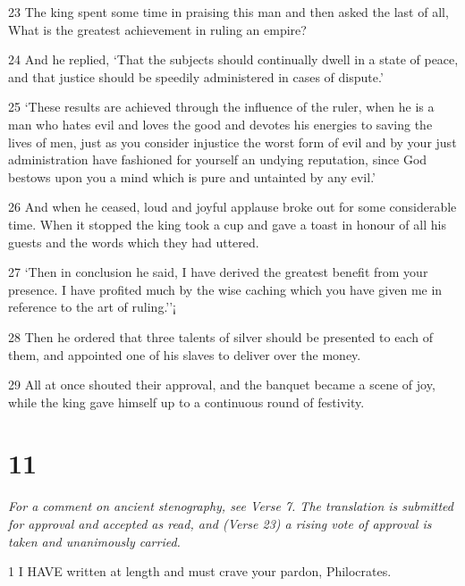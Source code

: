 \par 23 The king spent some time in praising this man and then asked the last of all, What is the greatest achievement in ruling an empire?

\par 24 And he replied, ‘That the subjects should continually dwell in a state of peace, and that justice should be speedily administered in cases of dispute.’

\par 25 ‘These results are achieved through the influence of the ruler, when he is a man who hates evil and loves the good and devotes his energies to saving the lives of men, just as you consider injustice the worst form of evil and by your just administration have fashioned for yourself an undying reputation, since God bestows upon you a mind which is pure and untainted by any evil.’

\par 26 And when he ceased, loud and joyful applause broke out for some considerable time. When it stopped the king took a cup and gave a toast in honour of all his guests and the words which they had uttered.

\par 27 ‘Then in conclusion he said, I have derived the greatest benefit from your presence. I have profited much by the wise caching which you have given me in reference to the art of ruling.’'¡

\par 28 Then he ordered that three talents of silver should be presented to each of them, and appointed one of his slaves to deliver over the money.

\par 29 All at once shouted their approval, and the banquet became a scene of joy, while the king gave himself up to a continuous round of festivity.

\chapter{11}

\par \textit{For a comment on ancient stenography, see Verse 7. The translation is submitted for approval and accepted as read, and (Verse 23) a rising vote of approval is taken and unanimously carried.}

\par 1 I HAVE written at length and must crave your pardon, Philocrates.

